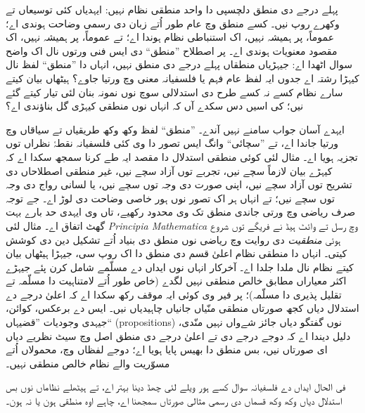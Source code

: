 \documentclass[../../../include/open-logic-section]{subfiles}
\begin{document}


پہلے درجے دی منطق دلچسپی دا واحد منطقی نظام نہیں:
ایہدیاں کئی توسیعاں تے وکھرے روپ نیں۔ کسے منطق وچ
عام طور اُتے زبان دی رسمی وضاحت ہوندی اے؛ عموماً،
پر ہمیشہ نہیں، اک استنباطی نظام ہوندا اے؛ تے عموماً،
پر ہمیشہ نہیں، اک مقصود معنویات ہوندی اے۔ پر اصطلاح
”منطق“ دی ایس فنی ورتوں نال اک واضح سوال اٹھدا اے:
جیہڑیاں منطقاں پہلے درجے دی منطق نہیں، انہاں دا
”منطق“ لفظ نال کیہڑا رشتہ اے جدوں ایہ لفظ عام فہم
یا فلسفیانہ معنی وچ ورتیا جاوے؟ ہیٹھاں بیان کیتے سارے
نظام کسے نہ کسے طرح دی استدلالی سوچ نوں نمونہ بنان
لئی تیار کیتے گئے نیں؛ کی اسیں دس سکدے آں کہ انہاں
نوں منطقی کیہڑی گل بناؤندی اے؟

ایہدے آسان جواب سامنے نہیں آندے۔ ”منطق“ لفظ وکھ وکھ
طریقیاں تے سیاقاں وچ ورتیا جاندا اے، تے ”سچائی“ وانگ
ایس تصور دا وی کئی فلسفیانہ نقطۂ نظراں توں تجزیہ
ہویا اے۔ مثال لئی کوئی منطقی استدلال دا مقصد ایہ طے
کرنا سمجھ سکدا اے کہ کیہڑے بیان لازماً سچے نیں، تجربے
توں آزاد سچے نیں، غیر منطقی اصطلاحاں دی تشریح توں
آزاد سچے نیں، اپنی صورت دی وجہ توں سچے نیں، یا
لسانی رواج دی وجہ توں سچے نیں؛ تے انہاں ہر اک
تصور نوں ہور خاصی وضاحت دی لوڑ اے۔ جے توجہ صرف
ریاضی وچ ورتی جاندی منطق تک وی محدود رکھیے، تاں
وی ایہدی حد بارے بہت گھٹ اتفاق اے۔ مثال لئی
\textit{Principia Mathematica} وچ رسل تے وائٹ ہیڈ
نے فریگے توں شروع ہوئی {\em منطقیت} دی روایت وچ
ریاضی نوں منطق دی بنیاد اُتے تشکیل دین دی کوشش
کیتی۔ انہاں دا منطقی نظام اعلیٰ قسم دی منطق دا
اک روپ سی، جیہڑا ہیٹھاں بیان کیتے نظام نال ملدا
جلدا اے۔ آخرکار انہاں نوں ایداں دے مسلّمے شامل
کرن پئے جیہڑے اکثر معیاراں مطابق خالص منطقی نہیں
لگدے (خاص طور اُتے لامتناہیت دا مسلّمہ تے
تقلیل پذیری دا مسلّمہ)؛ پر فیر وی کوئی ایہ موقف
رکھ سکدا اے کہ اعلیٰ درجے دے استدلال دیاں کجھ
صورتاں منطقی منّیاں جانیاں چاہیدیاں نیں۔ ایس دے
برعکس، کوائن، جیہدی وجودیات ”قضیہاں“
(propositions) نوں گفتگو دیاں جائز شےواں نہیں
منّدی، دلیل دیندا اے کہ دوجے درجے دی تے
اعلیٰ درجے دی منطق اصل وچ سیٹ نظریے دیاں
ای صورتاں نیں، بس منطق دا بھیس پایا ہویا اے؛
دوجے لفظاں وچ، محمولاں اُتے مسوّریت والے نظام
خالص منطقی نہیں۔

فی الحال ایداں دے فلسفیانہ سوال کسے ہور ویلے
لئی چھڈ دینا بہتر اے، تے ہیٹھلے نظاماں نوں بس
استدلال دیاں وکھ وکھ قسماں دی رسمی مثالی
صورتاں سمجھنا اے، چاہے اوہ منطقی ہون یا نہ ہون۔
\end{document}

